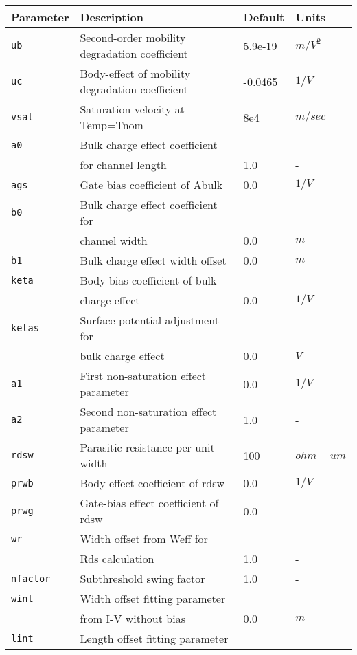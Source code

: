 \documentclass{article}
\begin{document}
\newpage
\begin{table}[H]
\begin{tabular}{|l| l| l| l|}
\hline
\textbf{Parameter} & \textbf{Description} & \textbf{Default} & \textbf{Units} \\
\hline
\texttt{ub} & Second-order mobility degradation coefficient & 5.9e-19 & $m/V^2$\\
\texttt{uc} & Body-effect of mobility degradation coefficient & -0.0465 & $1/V$\\
\texttt{vsat} & Saturation velocity at Temp=Tnom & 8e4 & $m/sec$\\
\texttt{a0} & Bulk charge effect coefficient & &\\
            & for channel length & 1.0 & -\\
\texttt{ags} & Gate bias coefficient of Abulk & 0.0 & $1/V$\\
\texttt{b0} & Bulk charge effect coefficient for & & \\
               & channel width & 0.0 & $m$\\
\texttt{b1} & Bulk charge effect width offset & 0.0 & $m$\\
\texttt{keta} & Body-bias coefficient of bulk & & \\
               & charge effect & 0.0 & $1/V$\\
\texttt{ketas} & Surface potential adjustment for & & \\
              & bulk charge effect & 0.0 & $V$\\
\texttt{a1} & First non-saturation effect parameter & 0.0 & $1/V$\\
\texttt{a2} & Second non-saturation effect parameter & 1.0 & - \\
\texttt{rdsw} & Parasitic resistance per unit width & 100 & $ohm-um$\\
\texttt{prwb} & Body effect coefficient of rdsw & 0.0 & $1/V$\\
\texttt{prwg} & Gate-bias effect coefficient of rdsw & 0.0 & -\\
\texttt{wr} & Width offset from Weff for & & \\
              & Rds calculation & 1.0 & -\\
\texttt{nfactor} & Subthreshold swing factor & 1.0 & -\\
\texttt{wint} & Width offset fitting parameter & & \\
             & from I-V without bias & 0.0 & $m$\\
\texttt{lint} & Length offset fitting parameter & &\\

\end{tabular}
\end{table}
\end{document}
